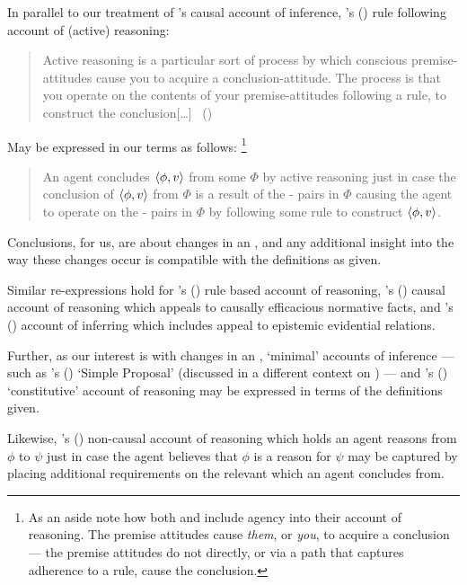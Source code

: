 \begin{note}
  In parallel to our treatment of \citeauthor{Armstrong:1968vh}'s  causal account of inference, \citeauthor{Broome:2002aa}'s (\citeyear{Broome:2013aa}) rule following account of (active) reasoning:
  \begin{quote}
    Active reasoning is a particular sort of process by which conscious premise-attitudes cause you to acquire a conclusion-attitude.
    The process is that you operate on the contents of your premise-attitudes following a rule, to construct the conclusion[\dots]
    \mbox{ }\hfill\mbox{(\citeyear[234]{Broome:2002aa})}
  \end{quote}
  May be expressed in our terms as follows:%
  \footnote{
    As an aside note how both \citeauthor{Armstrong:1968vh} and \citeauthor{Broome:2002aa} include agency into their account of reasoning.
    The premise attitudes cause \emph{them}, or \emph{you}, to acquire a conclusion --- the premise attitudes do not directly, or via a path that captures adherence to a rule, cause the conclusion.
  }
  \begin{quote}
    An agent concludes \(\langle\phi, v\rangle\) from some \pool{} \(\Phi\) by active reasoning just in case the \agents{} conclusion of \(\langle\phi, v\rangle\) from \(\Phi\) is a result of the - pairs in \(\Phi\) causing the agent to operate on the - pairs in \(\Phi\) by following some rule to construct \(\langle\phi, v\rangle\).
  \end{quote}
  Conclusions, for us, are about changes in an \agpe{}, and any additional insight into the way these changes occur is compatible with the definitions as given.

  Similar re-expressions hold for \citeauthor{Boghossian:2014aa}'s (\citeyear{Boghossian:2008vf,Boghossian:2014aa}) rule based account of reasoning, \citeauthor{Wedgwood:2006ui}'s (\citeyear{Wedgwood:2006ui}) causal account of reasoning which appeals to causally efficacious normative facts, and \citeauthor{Longino:1978wv}'s (\citeyear{Longino:1978wv}) account of inferring which includes appeal to epistemic evidential relations.
\end{note}


\begin{note}
  Further, as our interest is with changes in an \agpe{}, `minimal' accounts of inference --- such as \citeauthor{Wright:2014tt}'s (\citeyear{Wright:2014tt}) `Simple Proposal' (discussed in a different context on ) --- and \cite{Valaris:2014un}'s (\citeyear{Valaris:2014un}) `constitutive' account of reasoning may be expressed in terms of the definitions given.

  Likewise, \citeauthor{Thomson:1965vv}'s (\citeyear{Thomson:1965vv}) non-causal account of reasoning which holds an agent reasons from \(\phi\) to \(\psi\) just in case the agent believes that \(\phi\) is a reason for \(\psi\) may be captured by placing additional requirements on the relevant \pool{} which an agent concludes from.
\end{note}



